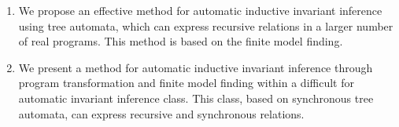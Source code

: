 {}
\begin{enumerate}[beginpenalty=10000] %
  \item We propose an effective method for automatic inductive invariant inference using tree automata, which can express recursive relations in a larger number of real programs. This method is based on the finite model finding.
  \item We present a method for automatic inductive invariant inference through program transformation and finite model finding within a difficult for automatic invariant inference class. This class, based on synchronous tree automata, can express recursive and synchronous relations.

\end{enumerate}
